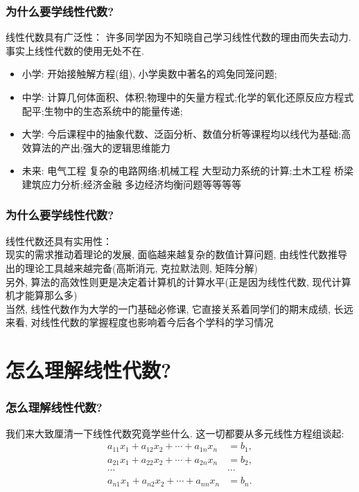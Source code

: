\documentclass{ctexbeamer}
\begin{document}
	\begin{frame}
	\frametitle{为什么要学线性代数?}
		线性代数具有广泛性：
		许多同学因为不知晓自己学习线性代数的理由而失去动力. 事实上线性代数的使用无处不在.\pause
		\begin{itemize}
			\item 小学: 开始接触解方程(组), 小学奥数中著名的鸡兔同笼问题;\pause
			\item 中学: 计算几何体面积、体积;\pause 物理中的矢量方程式;\pause 化学的氧化还原反应方程式配平;\pause 生物中的生态系统中的能量传递; \pause
			\item 大学:  今后课程中的抽象代数、泛函分析、数值分析等课程均以线代为基础;\pause 高效算法的产出;\pause 强大的逻辑思维能力\pause 
			\item 未来: 电气工程 复杂的电路网络;\pause 机械工程 大型动力系统的计算;\pause 土木工程 桥梁建筑应力分析;\pause 经济金融 多边经济均衡问题等等等等\pause 
		\end{itemize}
	\end{frame}
	
	\begin{frame}
	\frametitle{为什么要学线性代数?}
	线性代数还具有实用性：\\\pause
	现实的需求推动着理论的发展, 面临越来越复杂的数值计算问题, 由线性代数推导出的理论工具越来越完备(高斯消元, 克拉默法则, 矩阵分解) \\\pause
	另外, 算法的高效性则更是决定着计算机的计算水平(正是因为线性代数, 现代计算机才能算那么多) \\\pause
	当然, 线性代数作为大学的一门基础必修课, 它直接关系着同学们的期末成绩, 长远来看, 对线性代数的掌握程度也影响着今后各个学科的学习情况
	\end{frame}
	
	\section{怎么理解线性代数?}
	\begin{frame}
		\frametitle{怎么理解线性代数?}
		我们来大致厘清一下线性代数究竟学些什么. 这一切都要从多元线性方程组谈起:\pause
		\begin{equation*}
			\begin{aligned}
				a_{11}x_1+a_{12}x_2+\cdots+a_{1n}x_n&=b_1,\\
				a_{21}x_1+a_{22}x_2+\cdots+a_{2n}x_n&=b_2,\\
				\cdots&\cdots\\
				a_{n1}x_1+a_{n2}x_2+\cdots+a_{nn}x_n&=b_n.
			\end{aligned}
		\end{equation*}
	\end{frame}
	
\end{document}
